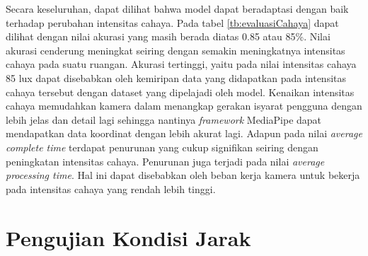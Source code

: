 Secara keseluruhan, dapat dilihat bahwa model dapat beradaptasi dengan baik terhadap perubahan intensitas cahaya. Pada tabel \ref{tb:evaluasiCahaya} dapat dilihat dengan nilai akurasi yang masih berada diatas 0.85 atau 85\%. Nilai akurasi cenderung meningkat seiring dengan semakin meningkatnya intensitas cahaya pada suatu ruangan. Akurasi tertinggi, yaitu pada nilai intensitas cahaya 85 lux dapat disebabkan oleh kemiripan data yang didapatkan pada intensitas cahaya tersebut dengan dataset yang dipelajadi oleh model. Kenaikan intensitas cahaya memudahkan kamera dalam menangkap gerakan isyarat pengguna dengan lebih jelas dan detail lagi sehingga nantinya \emph{framework} MediaPipe dapat mendapatkan data koordinat dengan lebih akurat lagi. Adapun pada nilai \emph{average complete time} terdapat penurunan yang cukup signifikan seiring dengan peningkatan intensitas cahaya. Penurunan juga terjadi pada nilai \emph{average processing time}. Hal ini dapat disebabkan oleh beban kerja kamera untuk bekerja pada intensitas cahaya yang rendah lebih tinggi.

\newpage
\section{Pengujian Kondisi Jarak}
\label{sec:analisisjarak}

